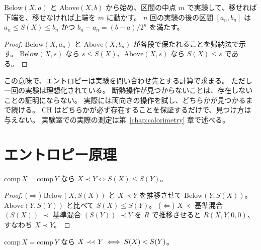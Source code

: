 \begin{theorem}[二分法によるエントロピーの測定]
  \label{thm:entropy-bisect}
  \leanok
  $\mathrm{Below}(X, a)$ と $\mathrm{Above}(X, b)$ から始め、区間の中点 $m$ で実験して、移せれば下端を、移せなければ上端を $m$ に動かす。
  $n$ 回の実験の後の区間 $[a_n, b_n]$ は $a_n \le S(X) \le b_n$ かつ $b_n - a_n = (b - a)/2^n$ を満たす。
\end{theorem}

\begin{proof}
  \leanok
  $\mathrm{Below}(X, a_n)$ と $\mathrm{Above}(X, b_n)$ が各段で保たれることを帰納法で示す。
  $\mathrm{Below}(X, s)$ なら $s \le S(X)$、$\mathrm{Above}(X, s)$ なら $S(X) \le s$ である。
\end{proof}

この意味で、エントロピーは実験を問い合わせ先とする計算で求まる。
ただし一回の実験は理想化されている。
断熱操作が見つからないことは、存在しないことの証明にならない。
実際には両向きの操作を試し、どちらかが見つかるまで続ける。
CH はどちらかが必ず存在することを保証するだけで、見つけ方は与えない。
実験室での実際の測定は第~\ref{chap:calorimetry} 章で述べる。

\section{エントロピー原理}

\begin{theorem}[エントロピー原理]
  \label{thm:entropy-principle}
  \leanok
  $\mathrm{comp}\, X = \mathrm{comp}\, Y$ なら $X \prec Y \iff S(X) \le S(Y)$。
\end{theorem}

\begin{proof}
  \leanok
  ($\Rightarrow$) $\mathrm{Below}(X, S(X))$ と $X \prec Y$ を推移させて $\mathrm{Below}(Y, S(X))$。
  $\mathrm{Above}(Y, S(Y))$ と比べて $S(X) \le S(Y)$。
  ($\Leftarrow$) $X \prec$ 基準混合 $(S(X))$ $\prec$ 基準混合 $(S(Y))$ $\prec Y$ を $R$ で推移させると $R(X, Y, 0, 0)$、すなわち $X \prec Y$。
\end{proof}

\begin{corollary}[不可逆性]
  \label{cor:strict}
  \leanok
  $\mathrm{comp}\, X = \mathrm{comp}\, Y$ なら $X \mathrel{\prec\!\prec} Y \iff S(X) < S(Y)$。
\end{corollary}


